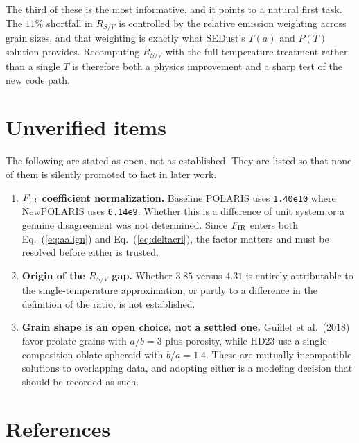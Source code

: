\documentclass{my_memo}
\newcommand{\code}[1]{\texttt{#1}}
\begin{document}
The third of these is the most informative, and it points to a natural
first task. The $11\%$ shortfall in $R_{S/V}$ is controlled by the
relative emission weighting across grain sizes, and that weighting is
exactly what SEDust's $T(a)$ and $P(T)$ solution provides. Recomputing
$R_{S/V}$ with the full temperature treatment rather than a single $T$ is
therefore both a physics improvement and a sharp test of the new code
path.

\section{Unverified items}
\label{sec:unverified}

The following are stated as open, not as established. They are listed so
that none of them is silently promoted to fact in later work.

\begin{enumerate}
\item \textbf{$F_{\rm IR}$ coefficient normalization.} Baseline POLARIS
      uses \code{1.40e10} where NewPOLARIS uses \code{6.14e9}. Whether
      this is a difference of unit system or a genuine disagreement was
      not determined. Since $F_{\rm IR}$ enters both
      Eq.~(\ref{eq:aalign}) and Eq.~(\ref{eq:deltacri}), the factor
      matters and must be resolved before either is trusted.

\item \textbf{Origin of the $R_{S/V}$ gap.} Whether $3.85$ versus $4.31$
      is entirely attributable to the single-temperature approximation,
      or partly to a difference in the definition of the ratio, is not
      established.

\item \textbf{Grain shape is an open choice, not a settled one.} Guillet
      et al.\ (2018) favor prolate grains with $a/b = 3$ plus porosity,
      while HD23 use a single-composition oblate spheroid with
      $b/a = 1.4$. These are mutually incompatible solutions to
      overlapping data, and adopting either is a modeling decision that
      should be recorded as such.
\end{enumerate}

\section{References}
\end{document}
